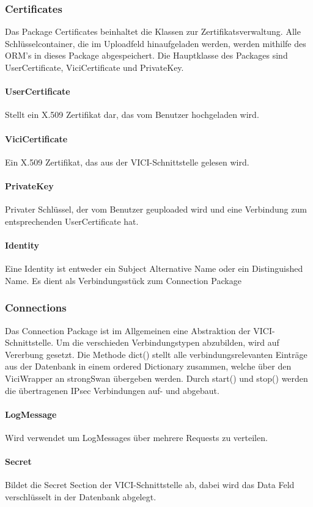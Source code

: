 \subsubsection{Certificates}
Das Package Certificates beinhaltet die Klassen zur Zertifikatsverwaltung. Alle Schlüsselcontainer, die im Uploadfeld hinaufgeladen werden, werden mithilfe des ORM's in dieses Package abgespeichert. Die Hauptklasse des Packages sind UserCertificate, ViciCertificate und PrivateKey.


\par
\begingroup
\leftskip=1.0cm 
\noindent
\paragraph{UserCertificate} Stellt ein X.509 Zertifikat dar, das vom Benutzer hochgeladen wird.
\paragraph{ViciCertificate} Ein X.509 Zertifikat, das aus der VICI-Schnittstelle gelesen wird.
\paragraph{PrivateKey} Privater Schlüssel, der vom Benutzer geuploaded wird und eine Verbindung zum entsprechenden UserCertificate hat.

\paragraph{Identity} Eine Identity ist entweder ein Subject Alternative Name oder ein Distinguished Name. Es dient als Verbindungsstück zum Connection Package

\par
\endgroup



\subsubsection{Connections}
Das Connection Package ist im Allgemeinen eine Abstraktion der VICI-Schnittstelle. Um die verschieden Verbindungstypen abzubilden, wird auf Vererbung gesetzt. Die Methode dict() stellt alle verbindungsrelevanten Einträge aus der Datenbank in einem ordered Dictionary zusammen, welche über den ViciWrapper an strongSwan übergeben werden. Durch start() und stop() werden die übertragenen IPsec Verbindungen auf- und abgebaut.

\par
\begingroup
\leftskip=1.0cm 
\noindent
\paragraph{LogMessage} Wird verwendet um LogMessages über mehrere Requests zu verteilen.

\paragraph{Secret} Bildet die Secret Section der VICI-Schnittstelle ab, dabei wird das Data Feld verschlüsselt in der Datenbank abgelegt. 

\par
\endgroup

\newpage